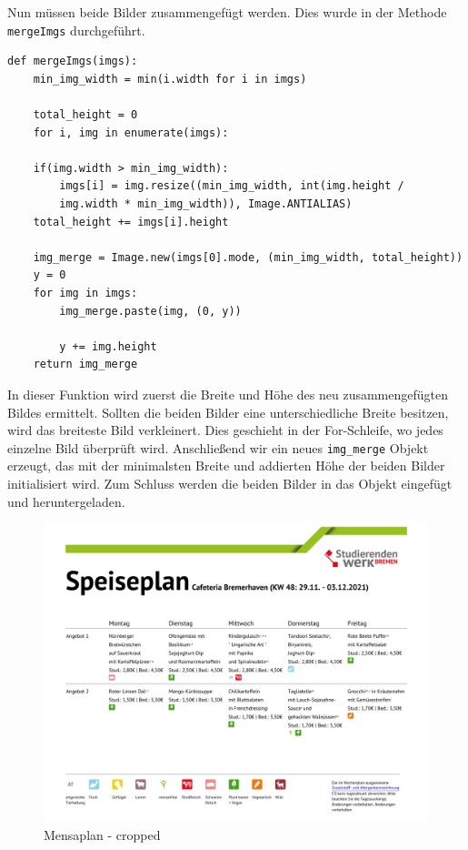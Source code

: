 Nun müssen beide Bilder zusammengefügt werden. Dies wurde in der Methode \verb|mergeImgs| durchgeführt.\\


\begin{lstlisting}
def mergeImgs(imgs):
    min_img_width = min(i.width for i in imgs)
    
    total_height = 0
    for i, img in enumerate(imgs):
    
    if(img.width > min_img_width):
        imgs[i] = img.resize((min_img_width, int(img.height / 
        img.width * min_img_width)), Image.ANTIALIAS)
    total_height += imgs[i].height
    
    img_merge = Image.new(imgs[0].mode, (min_img_width, total_height))
    y = 0
    for img in imgs:
        img_merge.paste(img, (0, y))
    
        y += img.height
    return img_merge
\end{lstlisting}

In dieser Funktion wird zuerst die Breite und Höhe des neu zusammengefügten Bildes ermittelt. Sollten die beiden Bilder eine unterschiedliche Breite besitzen, wird das breiteste Bild verkleinert. Dies geschieht in der For-Schleife, wo jedes einzelne Bild überprüft wird. 
Anschließend wir ein neues \verb|img_merge| Objekt erzeugt, das mit der minimalsten Breite und addierten Höhe der beiden Bilder initialisiert wird. Zum Schluss werden die beiden Bilder in das Objekt eingefügt und heruntergeladen.

\begin{figure}[H]
    \centering
    \includegraphics[width=15cm]{Figures/AppChapter/mensa_3.png}
    \caption{Mensaplan - cropped}
    \label{fig:Mensaplan}
    \centering
\end{figure}

